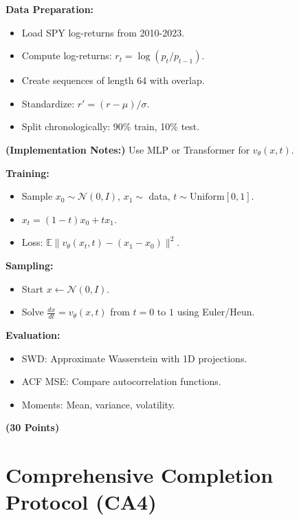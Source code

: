 \documentclass[a4paper,12pt]{article}
\begin{document}
\textbf{Data Preparation:}
\begin{itemize}
    \item Load SPY log-returns from 2010-2023.
    \item Compute log-returns: $r_t = \log(p_t / p_{t-1})$.
    \item Create sequences of length 64 with overlap.
    \item Standardize: $r' = (r - \mu) / \sigma$.
    \item Split chronologically: 90\% train, 10\% test.
\end{itemize}

\textbf{(Implementation Notes:)} Use MLP or Transformer for $v_\theta(x, t)$.

\textbf{Training:}
\begin{itemize}
    \item Sample $x_0 \sim \mathcal{N}(0, I)$, $x_1 \sim$ data, $t \sim \mathrm{Uniform}[0,1]$.
    \item $x_t = (1-t) x_0 + t x_1$.
    \item Loss: $\mathbb{E} \|v_\theta(x_t, t) - (x_1 - x_0)\|^2$.
\end{itemize}

\textbf{Sampling:}
\begin{itemize}
    \item Start $x \leftarrow \mathcal{N}(0, I)$.
    \item Solve $\frac{dx}{dt} = v_\theta(x, t)$ from $t=0$ to $1$ using Euler/Heun.
\end{itemize}

\textbf{Evaluation:}
\begin{itemize}
    \item SWD: Approximate Wasserstein with 1D projections.
    \item ACF MSE: Compare autocorrelation functions.
    \item Moments: Mean, variance, volatility.
\end{itemize}

\textbf{(30 Points)}

\section{Comprehensive Completion Protocol (CA4)}
\end{document}
